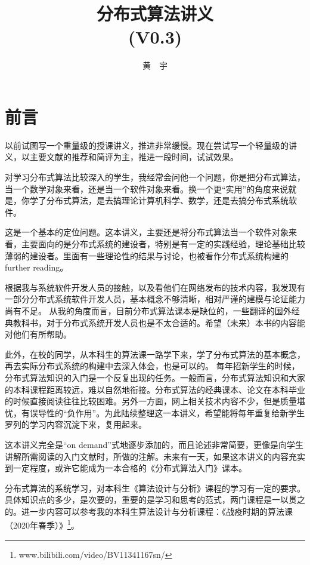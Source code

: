 \documentclass[UTF8]{ctexrep}
\begin{document}
\title{\Huge \bf 分布式算法讲义\\ {\large (V0.3)}}

\author{黄\ \ 宇}

\maketitle

\tableofcontents


\chapter*{前言}

以前试图写一个重量级的授课讲义，推进非常缓慢。现在尝试写一个轻量级的讲义，以主要文献的推荐和简评为主，推进一段时间，试试效果。

对学习分布式算法比较深入的学生，我经常会问他一个问题，你是把分布式算法，当一个数学对象来看，还是当一个软件对象来看。换一个更“实用”的角度来说就是，你学了分布式算法，是去搞理论计算机科学、数学，还是去搞分布式系统软件。

这是一个基本的定位问题。这本讲义，主要还是将分布式算法当一个软件对象来看，主要面向的是分布式系统的建设者，特别是有一定的实践经验，理论基础比较薄弱的建设者。里面有一些理论性的结果与讨论，也被看作分布式系统构建的further reading。

根据我与系统软件开发人员的接触，以及看他们在网络发布的技术内容，我发现有一部分分布式系统软件开发人员，基本概念不够清晰，相对严谨的建模与论证能力尚有不足。
从我的角度而言，目前分布式算法课本是缺位的，一些翻译的国外经典教科书，对于分布式系统开发人员也是不太合适的。希望（未来）本书的内容能对他们有所帮助。

此外，在校的同学，从本科生的算法课一路学下来，学了分布式算法的基本概念，再去实际分布式系统的构建中去深入体会，也是可以的。
每年招新学生的时候，分布式算法知识的入门是一个反复出现的任务。一般而言，分布式算法知识和大家的本科课程距离较远，难以自然地衔接。分布式算法的经典课本、论文在本科毕业的时候直接阅读往往比较困难。另外一方面，网上相关技术内容不少，但是质量堪忧，有误导性的“负作用”。为此陆续整理这一本讲义，希望能将每年重复给新学生罗列的学习内容沉淀下来，复用起来。

这本讲义完全是“on demand”式地逐步添加的，而且论述非常简要，更像是向学生讲解所需阅读的入门文献时，所做的注解。未来有一天，如果这本讲义的内容充实到一定程度，或许它能成为一本合格的《分布式算法入门》课本。

分布式算法的系统学习，对本科生《算法设计与分析》课程的学习有一定的要求。具体知识点的多少，是次要的，重要的是学习和思考的范式，两门课程是一以贯之的。进一步内容可以参考我的本科生算法设计与分析课程：《战疫时期的算法课（2020年春季）》\footnote{​www.bilibili.com/video/BV11341167sn/}。
\end{document}
